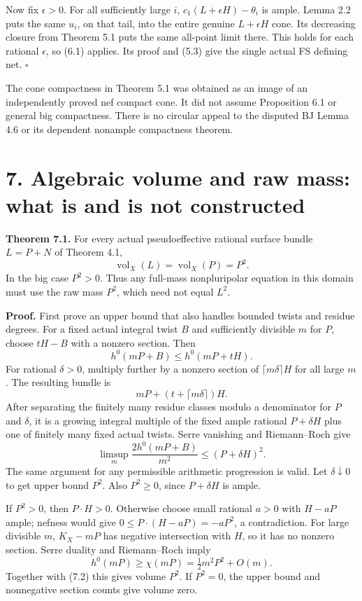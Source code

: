 \documentclass[
  10pt,
]{article}
\begin{document}
Now fix \(\epsilon>0\). For all sufficiently large \(i\),
\(c_1(L+\epsilon H)-\theta_i\) is ample. Lemma 2.2 puts the same
\(u_i\), on that tail, into the entire genuine \(L+\epsilon H\) cone.
Its decreasing closure from Theorem 5.1 puts the same all-point limit
there. This holds for each rational \(\epsilon\), so (6.1) applies. Its
proof and (5.3) give the single actual FS defining net. \(\square\)

The cone compactness in Theorem 5.1 was obtained as an image of an
independently proved nef compact cone. It did not assume Proposition 6.1
or general big compactness. There is no circular appeal to the disputed
BJ Lemma 4.6 or its dependent nonample compactness theorem.

\section{7. Algebraic volume and raw mass: what is and is not
constructed}\label{algebraic-volume-and-raw-mass-what-is-and-is-not-constructed}

\textbf{Theorem 7.1.} For every actual pseudoeffective rational surface
bundle \(L=P+N\) of Theorem 4.1, \[
 \operatorname{vol}_X(L)=\operatorname{vol}_X(P)=P^2.             \tag{7.1}
\] In the big case \(P^2>0\). Thus any full-mass nonpluripolar equation
in this domain must use the raw mass \(P^2\), which need not equal
\(L^2\).

\textbf{Proof.} First prove an upper bound that also handles bounded
twists and residue degrees. For a fixed actual integral twist \(B\) and
sufficiently divisible \(m\) for \(P\), choose \(tH-B\) with a nonzero
section. Then \[
 h^0(mP+B)\leq h^0(mP+tH).
\] For rational \(\delta>0\), multiply further by a nonzero section of
\(\lceil m\delta\rceil H\) for all large \(m\). The resulting bundle is
\[
 mP+(t+\lceil m\delta\rceil)H.
\] After separating the finitely many residue classes modulo a
denominator for \(P\) and \(\delta\), it is a growing integral multiple
of the fixed ample rational \(P+\delta H\) plus one of finitely many
fixed actual twists. Serre vanishing and Riemann--Roch give \[
 \limsup_m \frac{2h^0(mP+B)}{m^2}\leq(P+\delta H)^2.
                                                               \tag{7.2}
\] The same argument for any permissible arithmetic progression is
valid. Let \(\delta\downarrow0\) to get upper bound \(P^2\). Also
\(P^2\geq0\), since \(P+\delta H\) is ample.

If \(P^2>0\), then \(P\cdot H>0\). Otherwise choose small rational
\(a>0\) with \(H-aP\) ample; nefness would give
\(0\leq P\cdot(H-aP)=-aP^2\), a contradiction. For large divisible
\(m\), \(K_X-mP\) has negative intersection with \(H\), so it has no
nonzero section. Serre duality and Riemann--Roch imply \[
 h^0(mP)\geq\chi(mP)=\tfrac12m^2P^2+O(m).
\] Together with (7.2) this gives volume \(P^2\). If \(P^2=0\), the
upper bound and nonnegative section counts give volume zero.
\end{document}
